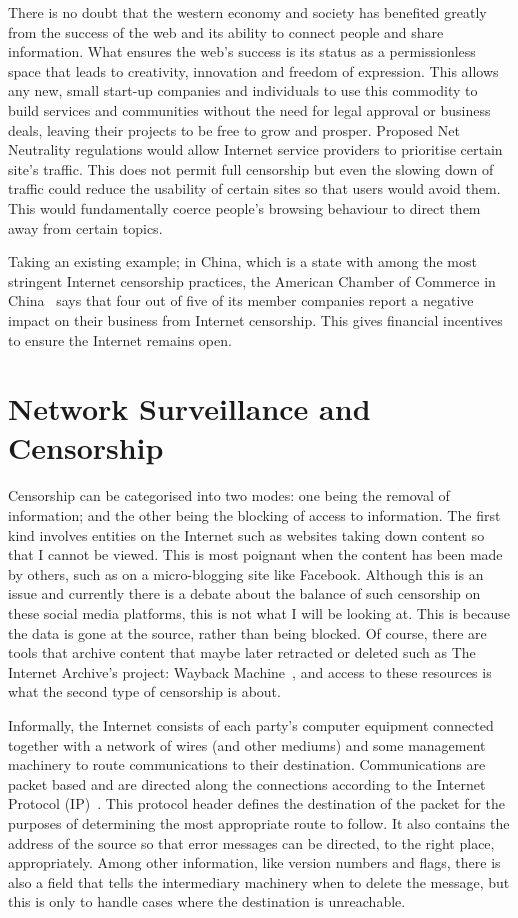 \documentclass[ %
                    author={Samuel Russell},
                supervisor={Prof. Bogdan Warinschi},
                    degree={MEng},
                     title={Innocuous Ciphertexts},
                  subtitle={The DE-CENSOR Scheme},
                      type={research},
                      year={2018} ]{dissertation}
\begin{document}
There is no doubt that the western economy and society has benefited greatly from the success of the web and its ability to connect people and share information. What ensures the web's success is its status as a permissionless space that leads to creativity, innovation and freedom of expression. This allows any new, small start-up companies and individuals to use this commodity to build services and communities without the need for legal approval or business deals, leaving their projects to be free to grow and prosper. Proposed Net Neutrality regulations would allow Internet service providers to prioritise certain site's traffic. This does not permit full censorship but even the slowing down of traffic could reduce the usability of certain sites so that users would avoid them. This would fundamentally coerce people's browsing behaviour to direct them away from certain topics.

Taking an existing example; in China, which is a state with among the most stringent Internet censorship practices, the American Chamber of Commerce in China~\cite{amcham} says that four out of five of its member companies report a negative impact on their business from Internet censorship. This gives financial incentives to ensure the Internet remains open.

\section{Network Surveillance and Censorship}

Censorship can be categorised into two modes: one being the removal of information; and the other being the blocking of access to information. The first kind involves entities on the Internet such as websites taking down content so that I cannot be viewed. This is most poignant when the content has been made by others, such as on a micro-blogging site like Facebook. Although this is an issue and currently there is a debate about the balance of such censorship on these social media platforms, this is not what I will be looking at. This is because the data is gone at the source, rather than being blocked. Of course, there are tools that archive content that maybe later retracted or deleted such as The Internet Archive's project: Wayback Machine~\cite{wb}, and access to these resources is what the second type of censorship is about.

Informally, the Internet consists of each party's computer equipment connected together with a network of wires (and other mediums) and some management machinery to route communications to their destination.
Communications are packet based and are directed along the connections according to the Internet Protocol (IP)~\cite{ip4}.
This protocol header defines the destination of the packet for the purposes of determining the most appropriate route to follow.
It also contains the address of the source so that error messages can be directed, to the right place, appropriately.
Among other information, like version numbers and flags, there is also a field that tells the intermediary machinery when to delete the message, but this is only to handle cases where the destination is unreachable.
\end{document}
